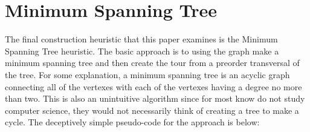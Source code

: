 \documentclass[midd]{thesis}
\newcommand{\tab}{\hspace*{2em}}
\begin{document}
\section{Minimum Spanning Tree}
\tab The final construction heuristic that this paper examines is the Minimum Spanning Tree heuristic. The basic approach is to using the graph make a minimum spanning tree and then create the tour from a preorder transversal of the tree. For some explanation, a minimum spanning tree is an acyclic graph connecting all of the vertexes with each of the vertexes having a degree no more than two. This is also an unintuitive algorithm since for most know do not study computer science, they would not necessarily think of creating a tree to make a cycle. The deceptively simple pseudo-code for the approach is below:\\
\end{document}
